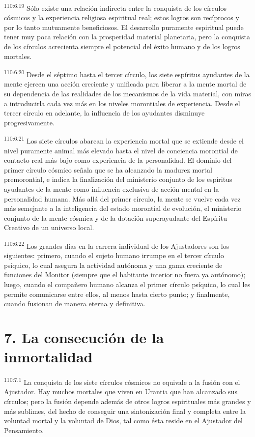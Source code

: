 \par
\textsuperscript{110:6.19} Sólo existe una relación indirecta entre la conquista de los círculos cósmicos y la experiencia religiosa espiritual real; estos logros son recíprocos y por lo tanto mutuamente beneficiosos. El desarrollo puramente espiritual puede tener muy poca relación con la prosperidad material planetaria, pero la conquista de los círculos acrecienta siempre el potencial del éxito humano y de los logros mortales.

\par
\textsuperscript{110:6.20} Desde el séptimo hasta el tercer círculo, los siete espíritus ayudantes de la mente ejercen una acción creciente y unificada para liberar a la mente mortal de su dependencia de las realidades de los mecanismos de la vida material, con miras a introducirla cada vez más en los niveles morontiales de experiencia. Desde el tercer círculo en adelante, la influencia de los ayudantes disminuye progresivamente.

\par
\textsuperscript{110:6.21} Los siete círculos abarcan la experiencia mortal que se extiende desde el nivel puramente animal más elevado hasta el nivel de conciencia morontial de contacto real más bajo como experiencia de la personalidad. El dominio del primer círculo cósmico señala que se ha alcanzado la madurez mortal premorontial, e indica la finalización del ministerio conjunto de los espíritus ayudantes de la mente como influencia exclusiva de acción mental en la personalidad humana. Más allá del primer círculo, la mente se vuelve cada vez más semejante a la inteligencia del estado morontial de evolución, el ministerio conjunto de la mente cósmica y de la dotación superayudante del Espíritu Creativo de un universo local.

\par
\textsuperscript{110:6.22} Los grandes días en la carrera individual de los Ajustadores son los siguientes: primero, cuando el sujeto humano irrumpe en el tercer círculo psíquico, lo cual asegura la actividad autónoma y una gama creciente de funciones del Monitor (siempre que el habitante interior no fuera ya autónomo); luego, cuando el compañero humano alcanza el primer círculo psíquico, lo cual les permite comunicarse entre ellos, al menos hasta cierto punto; y finalmente, cuando fusionan de manera eterna y definitiva.

\section*{7. La consecución de la inmortalidad}
\par
\textsuperscript{110:7.1} La conquista de los siete círculos cósmicos no equivale a la fusión con el Ajustador. Hay muchos mortales que viven en Urantia que han alcanzado sus círculos; pero la fusión depende además de otros logros espirituales más grandes y más sublimes, del hecho de conseguir una sintonización final y completa entre la voluntad mortal y la voluntad de Dios, tal como ésta reside en el Ajustador del Pensamiento.

